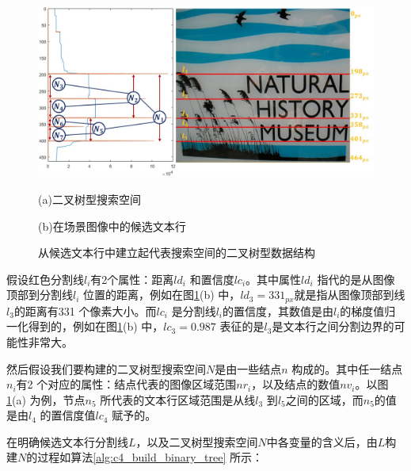     \begin{figure}[!h]
    \centering
    \includegraphics[width=\textwidth]{./figures/c4_binary_tree_construction.jpg}
    \begin{minipage}[t]{0.40\linewidth}
    \centerline{\small (a)二叉树型搜索空间}
    \end{minipage}
    \begin{minipage}[t]{0.51\linewidth}
    \centerline{\small(b)在场景图像中的候选文本行}
    \end{minipage}
    \caption{从候选文本行中建立起代表搜索空间的二叉树型数据结构}
    \label{fig.c4_binary_tree_construction}
    \end{figure}

    假设红色分割线$l_i$有2个属性：距离$ld_i$ 和置信度$lc_i$。其中属性$ld_i$ 指代的是从图像顶部到分割线$l_i$ 位置的距离，例如在图\ref{fig.c4_binary_tree_construction}(b) 中，$ld_3=331_{px}$就是指从图像顶部到线$l_3$的距离有331 个像素大小。而$lc_i$ 是分割线$l_i$的置信度，其数值是由$l_i$的梯度值归一化得到的，例如在图\ref{fig.c4_binary_tree_construction}(b) 中，$lc_3=0.987$ 表征的是$l_3$是文本行之间分割边界的可能性非常大。

    然后假设我们要构建的二叉树型搜索空间$N$是由一些结点$n$ 构成的。其中任一结点$n_i$有2 个对应的属性：结点代表的图像区域范围$nr_i$，以及结点的数值$nv_i$。以图\ref{fig.c4_binary_tree_construction}(a) 为例，节点$n_5$ 所代表的文本行区域范围是从线$l_3$ 到$l_5$之间的区域，而$n_5$的值是由$l_4$ 的置信度值$lc_4$ 赋予的。

    在明确候选文本行分割线$L$，以及二叉树型搜索空间$N$中各变量的含义后，由$L$构建$N$的过程如算法\ref{alg:c4_build_binary_tree} 所示：

